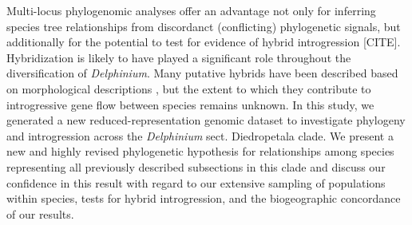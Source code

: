 \documentclass[11pt]{article}
\begin{document}
Multi-locus phylogenomic analyses offer an advantage not only for inferring
species tree relationships from discordanct (conflicting) phylogenetic signals, 
but additionally for the potential to test for evidence of hybrid introgression
[CITE].
% 
Hybridization is likely to have played a significant role throughout the 
diversification of \emph{Delphinium}. 
Many putative hybrids have been described based on morphological descriptions 
\citep{ewan_1945, warnock_1997}, %
but the extent to which they contribute to introgressive gene 
flow between species remains unknown.
% 
% 
In this study, we generated a new reduced-representation genomic dataset to 
investigate phylogeny and introgression across the \emph{Delphinium} sect. 
Diedropetala clade. 
% 
We present a new and highly revised phylogenetic hypothesis for relationships
among species representing all previously described subsections in this clade 
and discuss our confidence in this result with regard to our 
extensive sampling of populations within species, tests for hybrid 
introgression, and the biogeographic concordance of our results.
\end{document}
